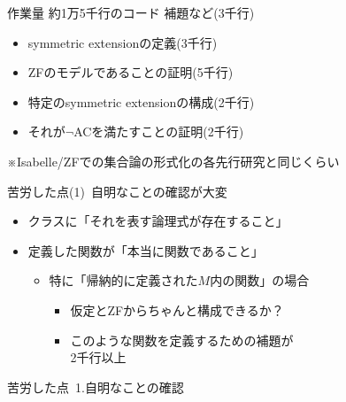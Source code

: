 \documentclass[17pt,aspectratio=169]{beamer}
\begin{document}
\begin{frame}{作業量}
    約1万5千行のコード \hspace{0.6cm} {\small 補題など(3千行)}
    {\small
    \begin{itemize}[itemsep=8pt]
        \item symmetric extensionの定義(3千行)
        \item ZFのモデルであることの証明(5千行)
        \item 特定のsymmetric extensionの構成(2千行)
        \item それが$\neg$ACを満たすことの証明(2千行)
    \end{itemize} 

    ※Isabelle/ZFでの集合論の形式化の各先行研究と同じくらい
    }
\end{frame}

\begin{frame}{苦労した点(1)\, {\normalsize 自明なことの確認が大変}}
    \begin{itemize}[left=0cm]
        \item クラスに「それを表す論理式が存在すること」
        \item 定義した関数が「本当に関数であること」
        \vspace{5pt}
        {\small
        \begin{itemize}
            \item 特に「帰納的に定義された$M$内の関数」の場合
            \vspace{5pt}
            {\begin{itemize}[itemsep=5pt]
                \item 仮定とZFからちゃんと構成できるか？
                \item このような関数を定義するための補題が\\
                      2千行以上
            \end{itemize}}
        \end{itemize}
        }
    \end{itemize}
\end{frame}

\begin{frame}{苦労した点\, {\normalsize 1.自明なことの確認}}
    
\end{frame}
\end{document}
